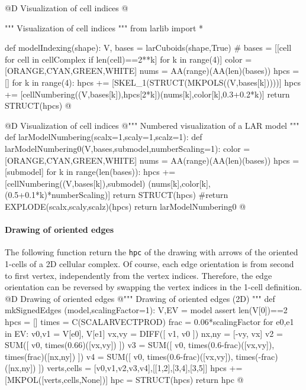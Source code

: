 \documentclass[11pt,oneside]{article}	%
\begin{document}
@D Visualization of cell indices
@{""" Visualization of cell indices """
from larlib import *

def modelIndexing(shape):
	V, bases = larCuboids(shape,True)
	# bases = [[cell for cell in cellComplex if len(cell)==2**k] for k in range(4)]
	color = [ORANGE,CYAN,GREEN,WHITE]
	nums = AA(range)(AA(len)(bases))
	hpcs = []
	for k in range(4):
		hpcs += [SKEL_1(STRUCT(MKPOLS((V,bases[k]))))]
		hpcs += [cellNumbering((V,bases[k]),hpcs[2*k])(nums[k],color[k],0.3+0.2*k)]
	return STRUCT(hpcs)
@}


@D Visualization of cell indices
@{""" Numbered visualization of a LAR model """
def larModelNumbering(scalx=1,scaly=1,scalz=1):
	def  larModelNumbering0(V,bases,submodel,numberScaling=1):
		color = [ORANGE,CYAN,GREEN,WHITE]
		nums = AA(range)(AA(len)(bases))
		hpcs = [submodel]
		for k in range(len(bases)):
			hpcs += [cellNumbering((V,bases[k]),submodel)
						(nums[k],color[k],(0.5+0.1*k)*numberScaling)]
		return STRUCT(hpcs)
		#return EXPLODE(scalx,scaly,scalz)(hpcs)
	return larModelNumbering0
@}



\paragraph{Drawing of oriented edges}
The following function return the \texttt{hpc} of the drawing with arrows of the oriented 1-cells of a 2D cellular complex. Of course, each edge orientation is from second to first vertex, independently from the vertex indices. Therefore, the edge orientation can be reversed by swapping the vertex indices in the 1-cell definition. 
@D Drawing of oriented edges
@{""" Drawing of oriented edges (2D) """
def mkSignedEdges (model,scalingFactor=1):
	V,EV = model
	assert len(V[0])==2
	hpcs = []
	times = C(SCALARVECTPROD)
	frac = 0.06*scalingFactor
	for e0,e1 in EV:
		v0,v1 = V[e0], V[e1]
		vx,vy = DIFF([ v1, v0 ])
		nx,ny = [-vy, vx]
		v2 = SUM([ v0, times(0.66)([vx,vy]) ])
		v3 = SUM([ v0, times(0.6-frac)([vx,vy]), times(frac)([nx,ny]) ])
		v4 = SUM([ v0, times(0.6-frac)([vx,vy]), times(-frac)([nx,ny]) ])
		verts,cells = [v0,v1,v2,v3,v4],[[1,2],[3,4],[3,5]]
		hpcs += [MKPOL([verts,cells,None])]
	hpc = STRUCT(hpcs)
	return hpc
@}
\end{document}
